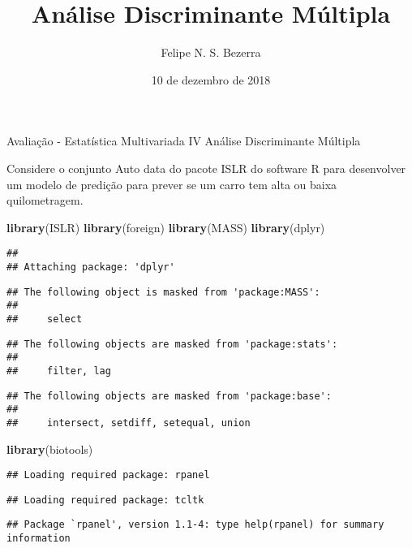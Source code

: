 \documentclass[]{article}
\title{Análise Discriminante Múltipla}
\author{Felipe N. S. Bezerra}
\date{10 de dezembro de 2018}
\newenvironment{Shaded}{\begin{snugshade}}{\end{snugshade}}
\newcommand{\KeywordTok}[1]{\textcolor[rgb]{0.13,0.29,0.53}{\textbf{#1}}}
\newcommand{\NormalTok}[1]{#1}
\begin{document}
\maketitle

Avaliação - Estatística Multivariada IV Análise Discriminante Múltipla

Considere o conjunto Auto data do pacote ISLR do software R para
desenvolver um modelo de predição para prever se um carro tem alta ou
baixa quilometragem.

\begin{Shaded}
\begin{Highlighting}[]
\KeywordTok{library}\NormalTok{(ISLR)}
\KeywordTok{library}\NormalTok{(foreign)}
\KeywordTok{library}\NormalTok{(MASS)}
\KeywordTok{library}\NormalTok{(dplyr)}
\end{Highlighting}
\end{Shaded}

\begin{verbatim}
## 
## Attaching package: 'dplyr'
\end{verbatim}

\begin{verbatim}
## The following object is masked from 'package:MASS':
## 
##     select
\end{verbatim}

\begin{verbatim}
## The following objects are masked from 'package:stats':
## 
##     filter, lag
\end{verbatim}

\begin{verbatim}
## The following objects are masked from 'package:base':
## 
##     intersect, setdiff, setequal, union
\end{verbatim}

\begin{Shaded}
\begin{Highlighting}[]
\KeywordTok{library}\NormalTok{(biotools)}
\end{Highlighting}
\end{Shaded}

\begin{verbatim}
## Loading required package: rpanel
\end{verbatim}

\begin{verbatim}
## Loading required package: tcltk
\end{verbatim}

\begin{verbatim}
## Package `rpanel', version 1.1-4: type help(rpanel) for summary information
\end{verbatim}
\end{document}
